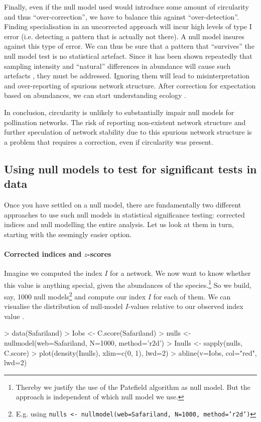 \documentclass[a4paper, 11pt]{article}
\begin{document}
Finally, even if the null model used would introduce some amount of circularity and thus ``over-correction'', we have to balance this against ``over-detection''. Finding specialisation in an uncorrected approach will incur high levels of type I error (i.e. detecting a pattern that is actually not there). A null model insures against this type of error. We can thus be sure that a pattern that ``survives'' the null model test is no statistical artefact. Since it has been shown repeatedly that sampling intensity and ``natural'' differences in abundance will cause such artefacts \citep{Dormann2009,Bluthgen2010,Joppa2009,Bluthgen2008}, they must be addressed. Ignoring them will lead to misinterpretation and over-reporting of spurious network structure. After correction for expectation based on abundances, we can start understanding ecology \citep{Vazquez2007}.

In conclusion, circularity is unlikely to substantially impair null models for pollination networks. The risk of reporting non-existent network structure and further speculation of network stability due to this spurious network structure is a problem that requires a correction, even if circularity was present.



\subsection{Using null models to test for significant tests in data}\label{sec:A:nullmodels}
Once you have settled on a null model, there are fundamentally two different approaches to use such null models in statistical significance testing: corrected indices and null modelling the entire analysis. Let us look at them in turn, starting with the seemingly easier option.

\paragraph{Corrected indices and $z$-scores}
Imagine we computed the index $I$ for a network. We now want to know whether this value is anything special, given the abundances of the species.\footnote{Thereby we justify the use of the Patefield algorithm as null model. But the approach is independent of which null model we use.} So we build, say, 1000 null models\footnote{E.g. using \texttt{nulls <- nullmodel(web=Safariland, N=1000, method='r2d')}} 
and compute our index $I$ for each of them. We can visualise the distribution of null-model $I$-values relative to our observed index value \citep{Dormann2009}.
\begin{Schunk}
\begin{Sinput}
> data(Safariland)
> Iobs <- C.score(Safariland)
> nulls <- nullmodel(web=Safariland, N=1000, method='r2d')
> Inulls <- sapply(nulls, C.score)
> plot(density(Inulls), xlim=c(0, 1), lwd=2)
> abline(v=Iobs, col="red", lwd=2)
\end{Sinput}
\end{Schunk}
\end{document}
